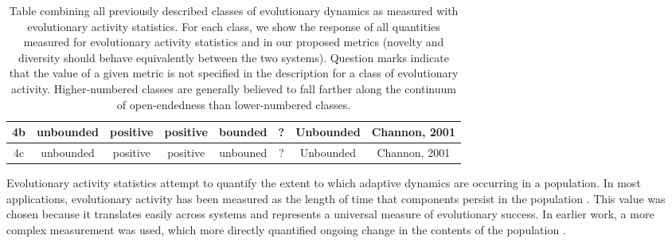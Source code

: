 \documentclass[letterpaper]{article}
\begin{document}
\begin{table}[]
\begin{tabular}{|c|c|c|c|c|c|c|c|}
4b             & unbounded                                                                                 & positive        & positive                                                             & bounded                                                            & ?                   & Unbounded                                                                                 & Channon, 2001         \\ \hline
4c             & unbounded                                                                                 & positive        & positive                                                             & unbouned                                                           & ?                   & Unbounded                                                                                 & Channon, 2001         \\ \hline
\end{tabular}
\caption{Table combining all previously described classes of evolutionary dynamics as measured with evolutionary activity statistics. For each class, we show the response of all quantities measured for evolutionary activity statistics and in our proposed metrics (novelty and diversity should behave equivalently between the two systems). Question marks indicate that the value of a given metric is not specified in the description for a class of evolutionary activity. Higher-numbered classes are generally believed to fall farther along the continuum of open-endedness than lower-numbered classes.}
\label{eastats}
\end{table}

Evolutionary activity statistics attempt
to quantify the extent to which adaptive dynamics are occurring in a population. In most applications, evolutionary activity has been measured as the length of time that components persist in the population \citep{bedau_comparison_1997, bedau_classification_1998, channon_improving_2003}. This value was chosen because it translates easily across systems and %
represents a universal measure of evolutionary success.
In earlier work, a more complex measurement was used, which more directly quantified ongoing change in the contents of the population \citep{langton_measurement_1992}. 
\end{document}
